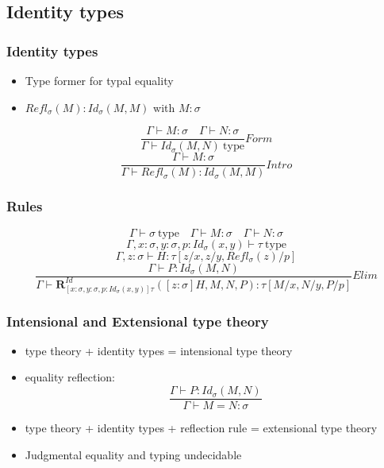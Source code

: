 \documentclass[aspectratio=169]{beamer}
\newcommand{\typ}{\ \mathrm{type}}
\newcommand{\Intro}{Intro}
\newcommand{\F}{Form}
\newcommand{\E}{Elim}
\newcommand{\Id}[2]{Id_\sigma(#1,#2)}
\newcommand{\Refl}[1]{Refl_\sigma(#1)}
\newcommand{\RID}[4]{\mathbold{R}_{[x:\sigma,y:\sigma,p:Id_\sigma(x,y)]\tau}^{Id}(#1, #2, #3, #4)}
\newcommand{\Gamdash}{\Gamma\vdash}
\begin{document}
    \subsection{Identity types}
    \begin{frame}
        \frametitle{Identity types}
        \begin{itemize}
            \item Type former for typal equality
            \item $\Refl{M} : \Id{M}{M}$ with $M : \sigma$
        \end{itemize}
        \vspace{20pt}
        $$\frac{\Gamdash M:\sigma \quad \Gamdash N:\sigma}{\Gamma \vdash \Id{M}{N} \typ}\F$$
        \vspace{15pt}
        $$\frac{\Gamdash M:\sigma}{\Gamdash\Refl{M}:\Id{M}{M}}\Intro$$
    \end{frame}
    \begin{frame}
        \frametitle{Rules}
        $$\Gamdash\sigma\typ\quad\Gamdash M:\sigma\quad\Gamdash N:\sigma$$
        $$\Gamma, x:\sigma,y:\sigma,p:\Id{x}{y}\vdash\tau\typ$$
        $$\Gamma,z:\sigma\vdash H:\tau[z/x,z/y,\Refl{z}/p]$$
        $$\frac{\Gamdash P:\Id{M}{N}}{\Gamdash\RID{[z:\sigma]H}{M}{N}{P}:\tau[M/x,N/y,P/p]}\E$$
    \end{frame}
    \begin{frame}
        \frametitle{Intensional and Extensional type theory}
        \begin{itemize}
            \item type theory + identity types = intensional type theory
            \item equality reflection:
            $$\frac{\Gamma \vdash P: \Id{M}{N}}{\Gamma \vdash M = N : \sigma}$$
            \item type theory + identity types + reflection rule = extensional type theory
            \item Judgmental equality and typing undecidable
        \end{itemize}
    \end{frame}
\end{document}
